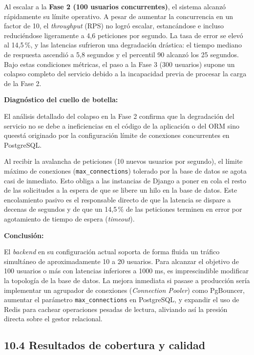 Al escalar a la \textbf{Fase 2 (100 usuarios concurrentes)}, el sistema alcanzó rápidamente su límite operativo. A pesar de aumentar la concurrencia en un factor de 10, el \textit{throughput} (RPS) no logró escalar, estancándose e incluso reduciéndose ligeramente a 4{,}6 peticiones por segundo. La tasa de error se elevó al 14{,}5\,\%, y las latencias sufrieron una degradación drástica: el tiempo mediano de respuesta ascendió a 5{,}8 segundos y el percentil 90 alcanzó los 25 segundos. Bajo estas condiciones métricas, el paso a la Fase 3 (300 usuarios) supone un colapso completo del servicio debido a la incapacidad previa de procesar la carga de la Fase 2.

\textbf{Diagnóstico del cuello de botella:}

El análisis detallado del colapso en la Fase 2 confirma que la degradación del servicio no se debe a ineficiencias en el código de la aplicación o del ORM sino queestá originado por la configuración límite de conexiones concurrentes en PostgreSQL.

Al recibir la avalancha de peticiones (10 nuevos usuarios por segundo), el límite máximo de conexiones (\texttt{max\_connections}) tolerado por
 la base de datos se agota casi de inmediato. Esto obliga a las instancias de Django a poner en cola el resto de las solicitudes a la espera de 
 que se libere un hilo en la base de datos. Este encolamiento pasivo es el responsable directo de que la latencia se dispare a decenas de segundos 
 y de que un 14{,}5\,\% de las peticiones terminen en error por agotamiento de tiempo de espera (\textit{timeout}).

\textbf{Conclusión:}

El \textit{backend} en su configuración actual soporta de forma fluida un tráfico simultáneo de aproximadamente 10 a 20 usuarios. 
Para alcanzar el objetivo de 100 usuarios o más con latencias inferiores a 1000 ms, es imprescindible modificar la topología de la 
base de datos. La mejora inmediata si pasase a producción sería implementar un agrupador de conexiones (\textit{Connection Pooler}) como PgBouncer, 
aumentar el parámetro \texttt{max\_connections} en PostgreSQL, y expandir el uso de Redis para cachear operaciones pesadas de lectura, 
aliviando así la presión directa sobre el gestor relacional.
\subsection{10.4 Resultados de cobertura y calidad}
\label{sec:cobertura-calidad}

